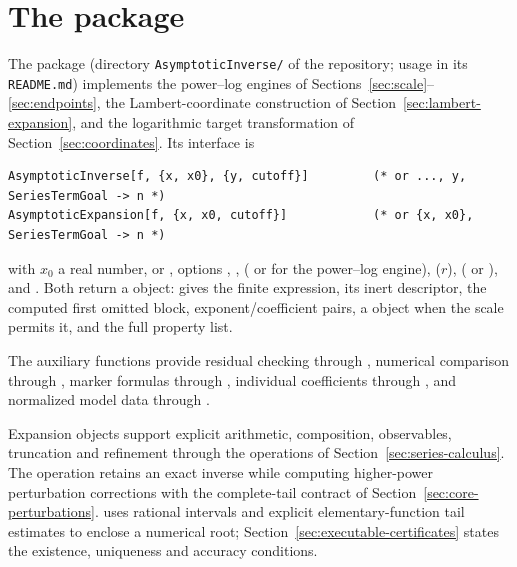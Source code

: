 \section{The package}
\label{sec:package}

The package  (directory \texttt{AsymptoticInverse/} of the repository; usage in its \texttt{README.md}) implements the power--log engines of Sections~\ref{sec:scale}--\ref{sec:endpoints}, the Lambert-coordinate construction of Section~\ref{sec:lambert-expansion}, and the logarithmic target transformation of Section~\ref{sec:coordinates}. Its interface is
\begin{lstlisting}
AsymptoticInverse[f, {x, x0}, {y, cutoff}]         (* or ..., y, SeriesTermGoal -> n *)
AsymptoticExpansion[f, {x, x0, cutoff}]            (* or {x, x0}, SeriesTermGoal -> n *)
\end{lstlisting}
with $x_0$ a real number,  or , options , ,  ( or  for the power--log engine),  ($r$),  ( or ),  and . Both return a  object:  gives the finite expression,  its inert descriptor,  the computed first omitted block,  exponent/coefficient pairs,  a  object when the scale permits it, and  the full property list.

The auxiliary functions provide residual checking through , numerical comparison through , marker formulas through , individual coefficients through , and normalized model data through .

Expansion objects support explicit arithmetic, composition, observables,
truncation and refinement through the  operations of
Section~\ref{sec:series-calculus}. The operation 
retains an exact inverse while computing higher-power perturbation corrections
with the complete-tail contract of Section~\ref{sec:core-perturbations}.
 uses rational intervals and explicit elementary-function
tail estimates to enclose a numerical root; Section~\ref{sec:executable-certificates}
states the existence, uniqueness and accuracy conditions.

